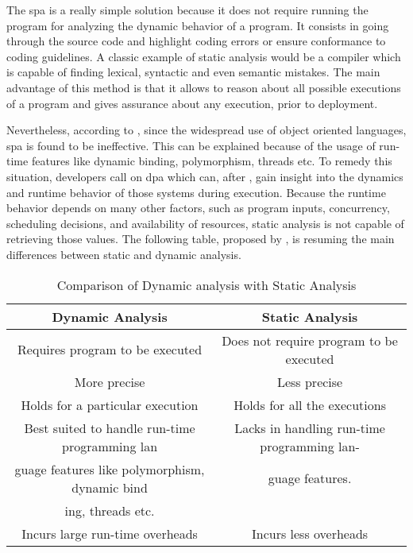 The \gls{spa} is a really simple solution because it does not require running the program for analyzing the dynamic behavior of a program. It consists in going through the source code and highlight coding errors or ensure conformance to coding guidelines. A classic example of static analysis would be a compiler which is capable of finding lexical, syntactic and even semantic mistakes. The main advantage of this method is that it allows to reason about all possible executions of a program and gives assurance about any execution, prior to deployment. 

Nevertheless, according to \cite{Gosain2015}, since the widespread use of object oriented languages, \gls{spa} is found to be ineffective. This can be explained because of the usage of run-time features like dynamic binding, polymorphism, threads etc. To remedy this situation, developers call on \gls{dpa} which can, after \cite{Marek2015100}, gain insight into the dynamics and runtime behavior of those systems during execution. Because the runtime behavior depends on many other factors, such as program inputs, concurrency, scheduling decisions, and availability of resources, static analysis is not capable of retrieving those values. The following table, proposed by \cite{Gosain2015}, is resuming the main differences between static and dynamic analysis.

\bigskip

\begin{table}[htb]
\begin{center}
\begin{tabulary}{\textwidth}{CC}
  \hline
  Dynamic Analysis 	& Static Analysis \\\hline
  Requires program to be executed	& Does not require program to be executed \\
  More precise & Less precise \\
  Holds for a particular execution & Holds for all the executions \\
  Best suited to handle run-time programming lan & Lacks in handling run-time programming lan-\\
guage features like polymorphism, dynamic bind & guage features.\\
ing, threads etc. &  \\
  Incurs large run-time overheads & Incurs less overheads \\\hline
\end{tabulary}
\end{center}
\caption{Comparison of Dynamic analysis with Static Analysis}
\label{list:survey}
\end{table}

